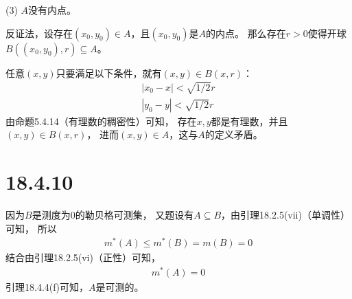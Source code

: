 \documentclass{article}
\begin{document}
(3) $A$没有内点。

反证法，设存在$(x_0, y_0) \in A$，且$(x_0, y_0)$是$A$的内点。
那么存在$r > 0$使得开球$B((x_0, y_0), r) \subseteq A$。

任意$(x, y)$只要满足以下条件，就有$(x, y) \in B(x, r)$：
\begin{align*}
 |x_0 - x| < \sqrt{1/2}r \\
 |y_0 - y| < \sqrt{1/2}r
\end{align*}
由命题5.4.14（有理数的稠密性）可知，
存在$x, y$都是有理数，并且$(x, y) \in B(x, r)$，
进而$(x, y) \in A$，这与$A$的定义矛盾。

\section*{18.4.10}

因为$B$是测度为$0$的勒贝格可测集，
又题设有$A \subseteq B$，由引理18.2.5(vii)（单调性）可知，
所以
\begin{align*}
  m^{\ast}(A) \leq m^{\ast}(B) = m(B) = 0
\end{align*}
结合由引理18.2.5(vi)（正性）可知，
\begin{align*}
  m^{\ast}(A) = 0
\end{align*}
引理18.4.4(f)可知，$A$是可测的。
\end{document}

